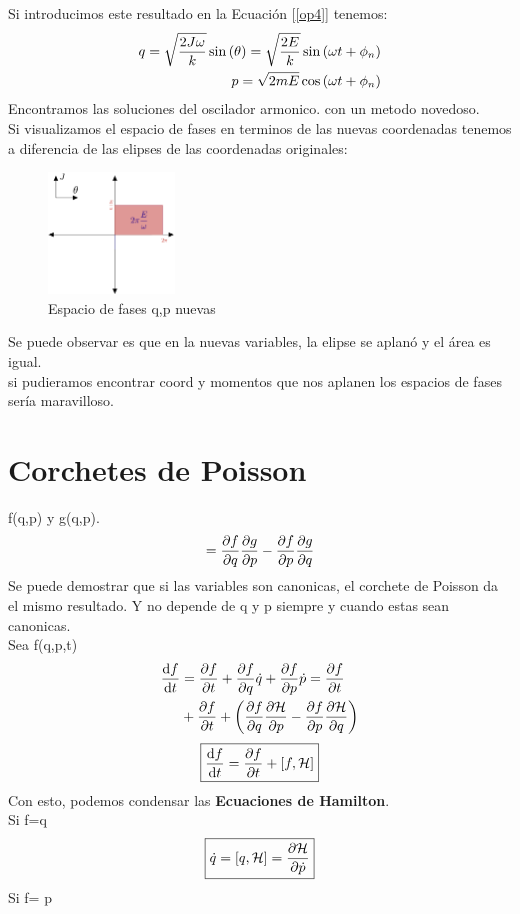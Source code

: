 \documentclass[12pt]{article}
\newcommand{\s}[1]{\section{#1}}
\newcommand{\en}[1]{\[\boxed{#1}\]}
\newcommand{\coss}[1]{\cos{\qty(#1)}}
\newcommand{\sinn}[1]{\sin{\qty(#1)}}
\newcommand{\eqreff}[1]{Ecuación [\ref{#1}]}
\newcommand{\rojo}[1]{{\color{rojo}#1}}
\begin{document}
Si introducimos este resultado en la \eqreff{op4} tenemos:
\begin{align}
q= \sqrt{\frac{2J \omega}{k}} \sinn{\theta}= \sqrt{\frac{2E}{k}} \sinn{\omega t + \phi_n}\\
p= \sqrt{2mE} \coss{\omega t + \phi_n}
\end{align}	
Encontramos las soluciones del oscilador armonico. con un metodo novedoso. \\
Si visualizamos el espacio de fases en terminos de las nuevas coordenadas tenemos a diferencia de las elipses de las coordenadas originales:

\begin{figure}[h!]
    \centering
    \includegraphics[width=0.3\textwidth]{edf_jt.png}
    \caption{Espacio de fases q,p nuevas}
    \label{edf_jt}
\end{figure}

Se puede observar es que en la nuevas variables, la elipse se aplanó y el área es igual. \\
si pudieramos encontrar coord y momentos que nos aplanen los espacios de fases sería maravilloso.\\
\pagebreak
\s{Corchetes de Poisson}

f(q,p) y g(q,p).
\begin{align}
[f,g]= \pdv{f}{q} \pdv{g}{p}-\pdv{f}{p} \pdv{g}{q}
\end{align}
Se puede demostrar que si las variables son canonicas, el corchete de Poisson da el mismo resultado. Y no depende de q y p siempre y cuando estas sean canonicas.\\
Sea f(q,p,t)
\begin{align}
	\dv{f}{t} &= \pdv{f}{t}+ \pdv{f}{q}\dot{q}+ \pdv{f}{p}\dot{p}= \pdv{f}{t}\\
	&+\pdv{f}{t}+\qty(\pdv{f}{q} \pdv{\mathcal{H} }{p} - \pdv{f}{p} \pdv{\mathcal{H}}{q} )
\end{align}
\en{\dv{f}{t}= \pdv{f}{t}+ [f,\mathcal{H}] }
Con esto, podemos condensar las \textbf{Ecuaciones de Hamilton}.\\
Si f=q
\rojo{\en{\dot{q}=[q,\mathcal{H}]= \pdv{\mathcal{H}}{\dot{p}} }}
Si f= p 
\end{document}
